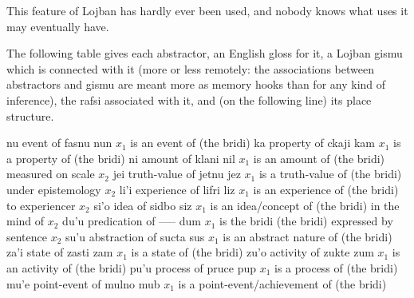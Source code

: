 This feature of Lojban has hardly ever been used, and nobody
    knows what uses it may eventually have.



The following table gives each abstractor, an English gloss
    for it, a Lojban gismu which is connected with it (more or less
    remotely: the associations between abstractors and gismu are
    meant more as memory hooks than for any kind of inference), the
    rafsi associated with it, and (on the following line) its place
    structure.

nu event of    fasnu       nun
        $x_1$ is an event of (the bridi)
ka  property of ckaji       kam
        $x_1$ is a property of (the bridi)
ni  amount of   klani       nil
        $x_1$ is an amount of (the bridi)
            measured on scale $x_2$
jei truth-value of  jetnu       jez
        $x_1$ is a truth-value of (the bridi)
            under epistemology $x_2$
li'i    experience of   lifri       liz
        $x_1$ is an experience of (the bridi)
            to experiencer $x_2$
si'o    idea of     sidbo       siz
        $x_1$ is an idea/concept of (the bridi)
            in the mind of $x_2$
du'u    predication of  -----       dum
        $x_1$ is the bridi (the bridi)
            expressed by sentence $x_2$
su'u    abstraction of  sucta       sus
        $x_1$ is an abstract nature of (the bridi)
za'i    state of    zasti       zam
        $x_1$ is a state of (the bridi)
zu'o    activity of zukte       zum
        $x_1$ is an activity of (the bridi)
pu'u    process of  pruce       pup
        $x_1$ is a process of (the bridi)
mu'e    point-event of  mulno       mub
        $x_1$ is a point-event/achievement
            of (the bridi)
